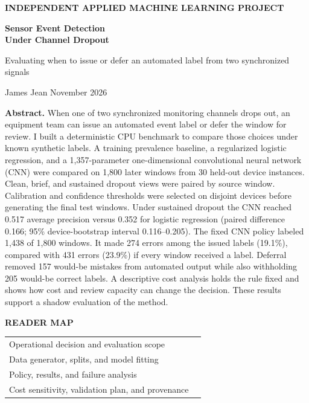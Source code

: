 \documentclass[11pt,letterpaper]{article}
\begin{document}
\thispagestyle{empty}
{\color{accent}\sffamily\small\bfseries INDEPENDENT APPLIED MACHINE LEARNING PROJECT\par}
\vspace{.35in}
{\Huge\bfseries Sensor Event Detection\\[.1em] Under Channel Dropout\par}
\vspace{.14in}
{\Large\color{ink}Evaluating when to issue or defer an automated label from two synchronized signals\par}
\vspace{.22in}
{\large James Jean \quad \textbar\quad November 2026\par}
\vspace{.25in}

\textbf{Abstract.}
When one of two synchronized monitoring channels drops out, an equipment team can issue an automated event label or defer the window for review. I built a deterministic CPU benchmark to compare those choices under known synthetic labels. A training prevalence baseline, a regularized logistic regression, and a 1,357-parameter one-dimensional convolutional neural network (CNN) were compared on 1,800 later windows from 30 held-out device instances. Clean, brief, and sustained dropout views were paired by source window. Calibration and confidence thresholds were selected on disjoint devices before generating the final test windows. Under sustained dropout the CNN reached 0.517 average precision versus 0.352 for logistic regression (paired difference 0.166; 95\% device-bootstrap interval 0.116--0.205). The fixed CNN policy labeled 1,438 of 1,800 windows. It made 274 errors among the issued labels (19.1\%), compared with 431 errors (23.9\%) if every window received a label. Deferral removed 157 would-be mistakes from automated output while also withholding 205 would-be correct labels. A descriptive cost analysis holds the rule fixed and shows how cost and review capacity can change the decision. These results support a shadow evaluation of the method.

\vspace{.17in}
{\small\sffamily\color{accent}\bfseries READER MAP\par}
\begin{tabular}{@{}p{.75\linewidth}r@{}}
Operational decision and evaluation scope & \pageref{sec:decision}\\
Data generator, splits, and model fitting & \pageref{sec:data}\\
Policy, results, and failure analysis & \pageref{sec:policy}\\
Cost sensitivity, validation plan, and provenance & \pageref{sec:cost}
\end{tabular}
\end{document}
